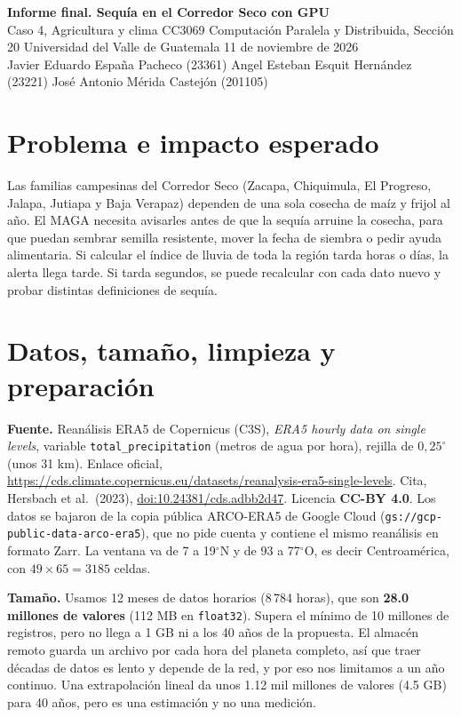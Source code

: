 \documentclass[10pt]{article}
\begin{document}
\begin{center}{\LARGE\bfseries Informe final. Sequ\'ia en el Corredor Seco con GPU}\\[3pt]
Caso 4, Agricultura y clima \textperiodcentered{} CC3069 Computaci\'on Paralela y Distribuida, Secci\'on 20 \textperiodcentered{} Universidad del Valle de Guatemala \textperiodcentered{} 11 de noviembre de 2026\\[3pt]
Javier Eduardo Espa\~na Pacheco (23361) \textperiodcentered{} Angel Esteban Esquit Hern\'andez (23221) \textperiodcentered{} Jos\'e Antonio M\'erida Castej\'on (201105)\end{center}

\section{Problema e impacto esperado}
Las familias campesinas del Corredor Seco (Zacapa, Chiquimula, El Progreso, Jalapa, Jutiapa y Baja Verapaz) dependen de una sola cosecha de ma\'iz y frijol al a\~no. El MAGA necesita avisarles antes de que la sequ\'ia arruine la cosecha, para que puedan sembrar semilla resistente, mover la fecha de siembra o pedir ayuda alimentaria. Si calcular el \'indice de lluvia de toda la regi\'on tarda horas o d\'ias, la alerta llega tarde. Si tarda segundos, se puede recalcular con cada dato nuevo y probar distintas definiciones de sequ\'ia.

\section{Datos, tama\~no, limpieza y preparaci\'on}
\textbf{Fuente.} Rean\'alisis ERA5 de Copernicus (C3S), \emph{ERA5 hourly data on single levels}, variable \texttt{total\_precipitation} (metros de agua por hora), rejilla de $0{,}25^\circ$ (unos 31 km). Enlace oficial, \url{https://cds.climate.copernicus.eu/datasets/reanalysis-era5-single-levels}. Cita, Hersbach et al.\ (2023), \href{https://doi.org/10.24381/cds.adbb2d47}{doi:10.24381/cds.adbb2d47}. Licencia \textbf{CC-BY 4.0}. Los datos se bajaron de la copia p\'ublica ARCO-ERA5 de Google Cloud (\texttt{gs://gcp-public-data-arco-era5}), que no pide cuenta y contiene el mismo reanálisis en formato Zarr. La ventana va de 7 a 19$^\circ$N y de 93 a 77$^\circ$O, es decir Centroam\'erica, con $49\times65=3185$ celdas.

\textbf{Tama\~no.} Usamos 12 meses de datos horarios (8\,784 horas), que son \textbf{28.0 millones de valores} (112 MB en \texttt{float32}). Supera el m\'inimo de 10 millones de registros, pero no llega a 1 GB ni a los 40 a\~nos de la propuesta. El almac\'en remoto guarda un archivo por cada hora del planeta completo, as\'i que traer d\'ecadas de datos es lento y depende de la red, y por eso nos limitamos a un a\~no continuo. Una extrapolaci\'on lineal da unos 1.12 mil millones de valores (4.5 GB) para 40 a\~nos, pero es una estimaci\'on y no una medici\'on.
\end{document}
